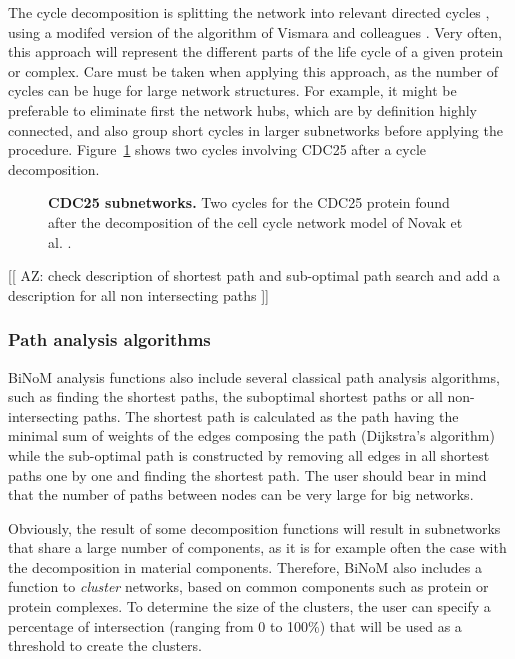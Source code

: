 \documentclass[10pt]{bmc_article}
\newenvironment{bmcformat}{\baselineskip20pt\sloppy\setboolean{publ}{false}}{\baselineskip20pt\sloppy}
\begin{document}
\begin{bmcformat}
The cycle decomposition is splitting the network into relevant directed cycles
\cite{gleiss2001relevant}, using a modifed version of the algorithm of Vismara
and colleagues \cite{vismara1997union}. Very often, this approach will represent
the different parts of the life cycle of a given protein or complex. Care must
be taken when applying this approach, as the number of cycles can be huge for
large network structures. For example, it might be preferable to eliminate first
the network hubs, which are by definition highly connected, and also group short
cycles in larger subnetworks before applying the procedure. Figure~\ref{mphasecdc25cycles} shows two
cycles involving CDC25 after a cycle decomposition.

\begin{figure}[h]
 \caption{\label{mphasecdc25cycles}  \textbf{CDC25 subnetworks.}
      Two cycles for the CDC25 protein found after the decomposition of the cell cycle network model of Novak et al. \cite{novak1998model}.}
\end{figure}


[[ AZ: check description of shortest path and sub-optimal path search and add a description for all non intersecting paths ]]

\subsubsection*{Path analysis algorithms}
BiNoM analysis functions also include several classical path analysis
algorithms, such as finding the shortest paths, the suboptimal shortest paths or
all non-intersecting paths. The shortest path is calculated as the path having
the minimal sum of weights of the edges composing the path (Dijkstra's
algorithm) while the sub-optimal path is constructed by removing all edges in
all shortest paths one by one and finding the shortest path. The user should
bear in mind that the number of paths between nodes can be
very large for big networks.

Obviously, the result of some decomposition functions will result in subnetworks
that share a large number of components, as it is for example often the case
with the decomposition in material components. Therefore, BiNoM also includes a
function to \emph{cluster} networks, based on common components such as protein
or protein complexes. To determine the size of the clusters, the user can
specify a percentage of intersection (ranging from 0 to 100\%) that will be used
as a threshold to create the clusters.


\end{bmcformat}
\end{document}
